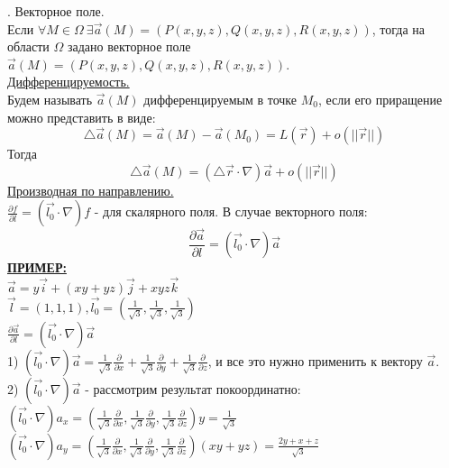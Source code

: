 \documentclass[12pt]{article}
\begin{document}
. Векторное поле.\\
Если $\forall M \in \Omega \ \exists \overrightarrow{a}(M) = (P(x,y,z),Q(x,y,z),R(x,y,z))$, тогда на области $\Omega$ задано векторное поле $\overrightarrow{a}(M) = (P(x,y,z),Q(x,y,z),R(x,y,z))$.\\
\uline{Дифференцируемость.}\\
Будем называть $\overrightarrow{a}(M)$ дифференцируемым в точке $M_0$, если его приращение можно представить в виде:\\
$${\bigtriangleup \overrightarrow{a}(M)} = \overrightarrow{a}(M) - \overrightarrow{a}(M_0) = L(\overrightarrow{r})+o(||\overrightarrow{r}||)$$
Тогда\\
$${\bigtriangleup \overrightarrow{a}(M)} = ({\bigtriangleup \overrightarrow{r}} \cdot \nabla)\overrightarrow{a} + o(||\overrightarrow{r}||)$$
\uline{Производная по направлению.}\\
$\frac{\partial f}{\partial l} = (\overrightarrow{l_0} \cdot \nabla)f$ - для скалярного поля. В случае векторного поля:\\
$$\frac{\partial \overrightarrow{a}}{\partial l} = (\overrightarrow{l_0} \cdot \nabla)\overrightarrow{a}$$
\uline{\textbf{ПРИМЕР:}}\\
$\overrightarrow{a} = y \overrightarrow{i} + (xy + yz)\overrightarrow{j} + xyz \overrightarrow{k}$\\
$\overrightarrow{l} = (1,1,1), \overrightarrow{l_0} = (\frac{1}{\sqrt{3}},\frac{1}{\sqrt{3}},\frac{1}{\sqrt{3}})$\\
$\frac{\partial \overrightarrow{a}}{\partial l} = (\overrightarrow{l_0} \cdot \nabla)\overrightarrow{a}$\\
1) $(\overrightarrow{l_0} \cdot \nabla)\overrightarrow{a} = \frac{1}{\sqrt{3}} \frac{\partial}{\partial x} + \frac{1}{\sqrt{3}} \frac{\partial}{\partial y} + \frac{1}{\sqrt{3}} \frac{\partial}{\partial z}$, и все это нужно применить к вектору $\overrightarrow{a}$.\\
2) $(\overrightarrow{l_0} \cdot \nabla)\overrightarrow{a}$ - рассмотрим результат покоординатно:\\
$(\overrightarrow{l_0} \cdot \nabla)a_x = (\frac{1}{\sqrt{3}} \frac{\partial}{\partial x},\frac{1}{\sqrt{3}} \frac{\partial}{\partial y},\frac{1}{\sqrt{3}} \frac{\partial}{\partial z})y = \frac{1}{\sqrt{3}}$\\
$(\overrightarrow{l_0} \cdot \nabla)a_y = (\frac{1}{\sqrt{3}} \frac{\partial}{\partial x},\frac{1}{\sqrt{3}} \frac{\partial}{\partial y},\frac{1}{\sqrt{3}} \frac{\partial}{\partial z})(xy+yz) = \frac{2y+x+z}{\sqrt{3}}$\\
\end{document}
